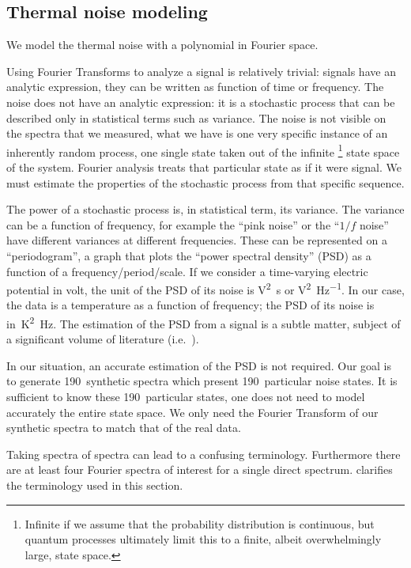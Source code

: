 \subsection{Thermal noise modeling}
We model the thermal noise with a polynomial in Fourier space.

Using Fourier Transforms to analyze a signal is relatively trivial: signals have an analytic expression, they can be written as function of time or frequency.
The noise does not have an analytic expression: it is a stochastic process that can be described only in statistical terms such as variance.
The noise is not visible on the spectra that we measured, what we have is one very specific instance of an inherently random process, one single state taken out of the infinite%
\footnote{Infinite if we assume that the probability distribution is continuous, but quantum processes ultimately limit this to a finite, albeit overwhelmingly large, state space.}
state space of the system.
Fourier analysis treats that particular state as if it were signal.
We must estimate the properties of the stochastic process from that specific sequence.

The power of a stochastic process is, in statistical term, its variance.
The variance can be a function of frequency, for example the ``pink noise'' or the ``$1/f$ noise'' have different variances at different frequencies.
These can be represented on a ``periodogram'', a graph that plots the ``power spectral density'' (PSD) as a function of a frequency/period/scale.
If we consider a time-varying electric potential in volt,
the unit of the PSD of its noise is \si{\volt\squared\second} or \si{\volt\squared\per\hertz}.
In our case, the data is a temperature as a function of frequency;
the PSD of its noise is in~\si{\kelvin\squared\hertz}.
The estimation of the PSD from a signal is a subtle matter, subject of a significant volume of literature (i.e.\ \textcite{burg1967maximum,percival1993spectral}).

In our situation, an accurate estimation of the PSD is not required.
Our goal is to generate 190~synthetic spectra which present 190~particular noise states.
It is sufficient to know these 190~particular states, one does not need to model accurately the entire state space.
We only need the Fourier Transform of our synthetic spectra to match that of the real data.

Taking spectra of spectra can lead to a confusing terminology.
Furthermore there are at least four Fourier spectra of interest for a single direct spectrum.
 clarifies the terminology used in this section.


